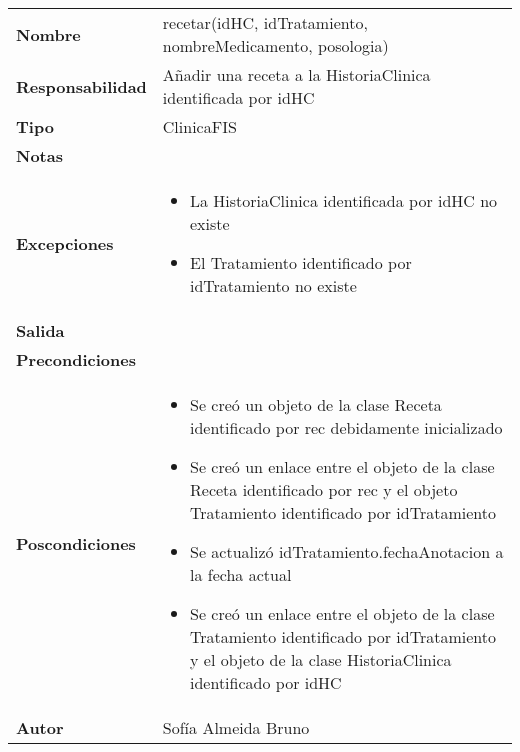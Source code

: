 \documentclass[11pt,a4paper]{article}
\newenvironment{itemizenomargins}
    {\begin{minipage}[t]{1\linewidth}\begin{itemize}}
    {\end{itemize}\end{minipage}}
\begin{document}
\begin{table}[H]
\centering
\label{my-label}
\begin{tabularx}{\textwidth}{l|X}
\textbf{Nombre}          & recetar(idHC, idTratamiento, nombreMedicamento, posologia) \\
\textbf{Responsabilidad} & Añadir una receta a la HistoriaClinica identificada por idHC\\
\textbf{Tipo}            & ClinicaFIS \\
\textbf{Notas}           &  \\
\textbf{Excepciones}     & 
\begin{itemizenomargins}
\item La HistoriaClinica identificada por idHC no existe
\item El Tratamiento identificado por idTratamiento no existe
\end{itemizenomargins}\\
\textbf{Salida}          &  \\
\textbf{Precondiciones}  &  \\
\textbf{Poscondiciones}  &
\begin{itemizenomargins}
\item Se creó un objeto de la clase Receta identificado por rec debidamente inicializado
\item Se creó un enlace entre el objeto de la clase Receta identificado por rec y el objeto Tratamiento identificado por idTratamiento
\item Se actualizó idTratamiento.fechaAnotacion a la fecha actual
\item Se creó un enlace entre el objeto de la clase Tratamiento identificado por idTratamiento y el objeto de la clase HistoriaClinica identificado por idHC
\end{itemizenomargins}\\
\textbf{Autor}           & Sofía Almeida Bruno
\end{tabularx}
\end{table}
\end{document}
